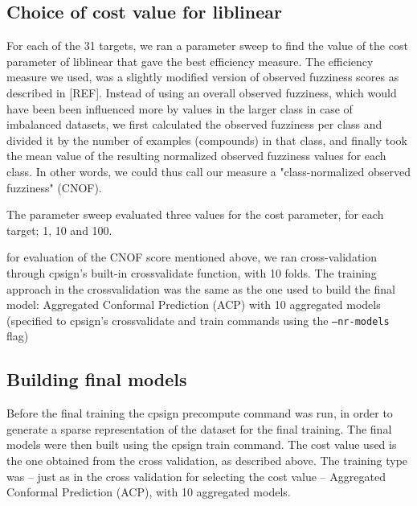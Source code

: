 \documentclass[utf8]{frontiersSCNS} %
\begin{document}
\subsection{Choice of cost value for liblinear}

For each of the 31 targets, we ran a parameter sweep to find the value of the
cost parameter of liblinear that gave the best efficiency measure. The
efficiency measure we used, was a slightly modified version of observed
fuzziness scores as described in [REF]. Instead of using an overall observed
fuzziness, which would have been been influenced more by values in the larger
class in case of imbalanced datasets, we first calculated the observed
fuzziness per class and divided it by the number of examples (compounds) in
that class, and finally took the mean value of the resulting normalized
observed fuzziness values for each class. In other words, we could thus call
our measure a "class-normalized observed fuzziness" (CNOF).

The parameter sweep evaluated three values for the cost parameter, for each
target; 1, 10 and 100.

for evaluation of the CNOF score mentioned above, we ran cross-validation
through cpsign's built-in crossvalidate function, with 10 folds.  The training
approach in the crossvalidation was the same as the one used to build the final
model: Aggregated Conformal Prediction (ACP) with 10 aggregated models
(specified to cpsign's crossvalidate and train commands using the
\texttt{--nr-models} flag)

\subsection{Building final models}

Before the final training the cpsign precompute command was run, in order to
generate a sparse representation of the dataset for the final training.
The final models were then built using the cpsign train command. The cost value
used is the one obtained from the cross validation, as described above.
The training type was -- just as in the cross validation for selecting the cost
value -- Aggregated Conformal Prediction (ACP), with 10 aggregated models.

\end{document}
